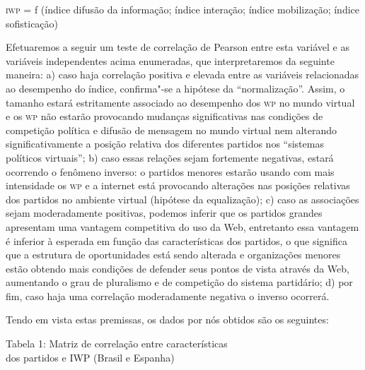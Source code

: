 \asterisc
\textsc{iwp} = f (índice difusão da informação; índice interação; índice
mobilização; índice sofisticação)
\asterisc

Efetuaremos a seguir um teste de correlação de Pearson entre esta
variável e as variáveis independentes acima enumeradas, que
interpretaremos da seguinte maneira: a) caso haja correlação positiva e
elevada entre as variáveis relacionadas ao desempenho do índice,
confirma"-se a hipótese da ``normalização''. Assim, o tamanho estará
estritamente associado ao desempenho dos \textsc{wp} no mundo virtual e os \textsc{wp} não
estarão provocando mudanças significativas nas condições de competição
política e difusão de mensagem no mundo virtual nem alterando
significativamente a posição relativa dos diferentes partidos nos
``sistemas políticos virtuais''; b) caso essas relações sejam fortemente
negativas, estará ocorrendo o fenômeno inverso: o partidos menores
estarão usando com mais intensidade os \textsc{wp} e a internet está provocando
alterações nas posições relativas dos partidos no ambiente virtual
(hipótese da equalização); c) caso as associações sejam moderadamente
positivas, podemos inferir que os partidos grandes apresentam uma
vantagem competitiva do uso da Web, entretanto essa vantagem é inferior
à esperada em função das características dos partidos, o que significa
que a estrutura de oportunidades está sendo alterada e organizações
menores estão obtendo mais condições de defender seus pontos de vista
através da Web, aumentando o grau de pluralismo e de competição do
sistema partidário; d) por fim, caso haja uma correlação moderadamente
negativa o inverso ocorrerá.

Tendo em vista estas premissas, os dados por nós obtidos são os
seguintes:

\pagebreak

\begin{center}
Tabela 1: Matriz de correlação entre características\\ dos partidos e IWP
(Brasil e Espanha)
\end{center}

